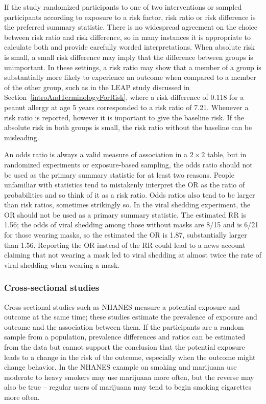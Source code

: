 If the study randomized participants to one of two interventions or sampled participants according to exposure to a risk factor, risk ratio or risk difference is the preferred summary statistic.  There is no widespread agreement on the choice between risk ratio and risk difference, so in many instances it is appropriate to calculate both and provide carefully worded interpretations. When absolute risk is small, a small risk difference may imply that the difference between groups is unimportant. In these settings, a risk ratio may show that a member of a group is substantially more likely to experience an outcome when compared to a member of the other group, such as in the LEAP study discussed in Section~\ref{introAndTerminologyForRisk}, where a risk difference of 0.118 for a peanut allergy at age 5 years corresponded to a risk ratio of 7.21.  Whenever a risk ratio is reported, however it is important to give the baseline risk.  If the absolute risk in both groups is small, the risk ratio without the baseline can be misleading.


An odds ratio is always a valid measure of association in a $2 \times 2$ table, but in randomized experiments or exposure-based sampling, the odds ratio should not be used as the primary summary statistic for at least two reasons.  People unfamiliar with statistics tend to mistakenly interpret the OR as the ratio of probabilities and so think of it as a risk ratio.  Odds ratios also tend to be larger than risk ratios, sometimes strikingly so.  In the viral shedding experiment, the OR should not be used as a primary summary statistic. The estimated RR is 1.56; the odds of viral shedding among those without masks are 8/15 and is 6/21 for those wearing masks, so the estimated the OR is 1.87, substantially larger than 1.56. Reporting the OR instead of the RR could lead to a news account claiming that not wearing a mask led to viral shedding at almost twice the rate of viral shedding when wearing a mask.

\subsubsection{Cross-sectional studies}

Cross-sectional studies such as NHANES measure a potential exposure and outcome at the same time; these studies estimate the prevalence of exposure and outcome and the association between them.  If the participants are a random sample from a population, prevalence differences and ratios can be estimated from the data but cannot support the conclusion that the potential exposure leads to a change in the risk of the outcome, especially when the outcome might change behavior. In the NHANES example on smoking and marijuana use moderate to heavy smokers may use marijuana more often, but the reverse may also be true -- regular users of marijuana may tend to begin smoking cigarettes more often.

